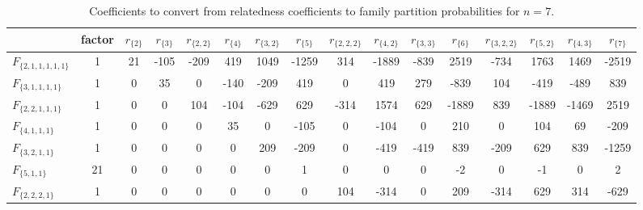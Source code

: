 \begin{table}[h]
\centering
\caption{Coefficients to convert from relatedness coefficients to family partition probabilities for $n=7$.}
\label{rho2psi7}
\begin{tabular}{lccccccccccccccc}
\toprule
                      &  factor &  $r_{\{2\}}$ &  $r_{\{3\}}$ &  $r_{\{2,2\}}$ &  $r_{\{4\}}$ &  $r_{\{3,2\}}$ &  $r_{\{5\}}$ &  $r_{\{2,2,2\}}$ &  $r_{\{4,2\}}$ &  $r_{\{3,3\}}$ &  $r_{\{6\}}$ &  $r_{\{3,2,2\}}$ &  $r_{\{5,2\}}$ &  $r_{\{4,3\}}$ &  $r_{\{7\}}$ \\
\midrule
$F_{\{2,1,1,1,1,1\}}$ &       1 &           21 &         -105 &           -209 &          419 &           1049 &        -1259 &              314 &          -1889 &           -839 &         2519 &             -734 &           1763 &           1469 &        -2519 \\
  $F_{\{3,1,1,1,1\}}$ &       1 &            0 &           35 &              0 &         -140 &           -209 &          419 &                0 &            419 &            279 &         -839 &              104 &           -419 &           -489 &          839 \\
  $F_{\{2,2,1,1,1\}}$ &       1 &            0 &            0 &            104 &         -104 &           -629 &          629 &             -314 &           1574 &            629 &        -1889 &              839 &          -1889 &          -1469 &         2519 \\
    $F_{\{4,1,1,1\}}$ &       1 &            0 &            0 &              0 &           35 &              0 &         -105 &                0 &           -104 &              0 &          210 &                0 &            104 &             69 &         -209 \\
    $F_{\{3,2,1,1\}}$ &       1 &            0 &            0 &              0 &            0 &            209 &         -209 &                0 &           -419 &           -419 &          839 &             -209 &            629 &            839 &        -1259 \\
      $F_{\{5,1,1\}}$ &      21 &            0 &            0 &              0 &            0 &              0 &            1 &                0 &              0 &              0 &           -2 &                0 &             -1 &              0 &            2 \\
    $F_{\{2,2,2,1\}}$ &       1 &            0 &            0 &              0 &            0 &              0 &            0 &              104 &           -314 &              0 &          209 &             -314 &            629 &            314 &         -629 \\

\end{tabular}
\end{table}
